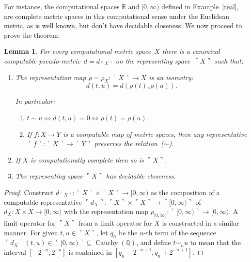 \documentclass[10pt]{article}
\newcommand{\cauchy}{\operatorname{Cauchy}}
\newcommand{\godel}[1]{\ulcorner #1 \urcorner}
\newtheorem{lemma}[cor]{Lemma}
\newcommand{\R}{\mathbb{R}}
\newcommand{\Q}{\mathbb{Q}}
\begin{document}
For instance, the computational spaces $\R$ and $[0,\infty)$ defined
in Example~\ref{real}, are complete metric spaces in this
computational sense under the Euclidean metric, as is well known, but
don't have decidable closeness.  We now proceed to prove the theorem.
\pagebreak[3]
\begin{lemma} \label{closeness:cover} For every computational metric
  space~$X$ there is a canonical computable pseudo-metric~$d =
  d_{\godel{X}}$ on the representing space~$\godel{X}$ such that:
  \begin{enumerate}
  \item The representation map $\rho = \rho_X \colon \godel{X} \to X$ is an isometry:
    \[ d(t,u) = d(\rho(t),\rho(u)). \]

  In particular:
    \begin{enumerate}
    \item $t \sim u \iff d(t,u)=0 \iff \rho(t)=\rho(u)$.
    \item If $f \colon X \to Y$ is a computable map of metric spaces,
      then any representative $\godel{f} \colon \godel{X} \to
      \godel{Y}$ preserves the relation~($\sim$).
  \end{enumerate}

  \item If $X$ is computationally complete then so is $\godel{X}$.

  \item The representing space $\godel{X}$ has decidable closeness.
  \end{enumerate}
\end{lemma}
\begin{proof}
  Construct $d_{\godel{X}} \colon \godel{X} \times \godel{X} \to
  {[0,\infty)}$ as the composition of a computable representative
  $\godel{d_X} \colon \godel{X} \times \godel{X} \to
  \godel{{[0,\infty)}}$ of $d_X \colon X \times X \to {[0,\infty)}$
  with the representation map $\rho_{{[0,\infty)}} \colon
  \godel{{[0,\infty)}} \to {[0,\infty)}$.  A limit operator for
  $\godel{X}$ from a limit operator for $X$ is constructed in a
  similar manner.  For given $t,u \in \godel{X}$, let $q_n$ be the
  $n$-th term of the sequence $\godel{d_X}(t,u) \in
  \godel{[0,\infty)}\subseteq \cauchy(\Q)$, and define $t \sim_n u$ to
  mean that the interval $[-2^{-n},2^{-n}]$ is contained in
  $[q_n-2^{-n+1},q_n+2^{-n+1}]$.
\end{proof}
\end{document}
